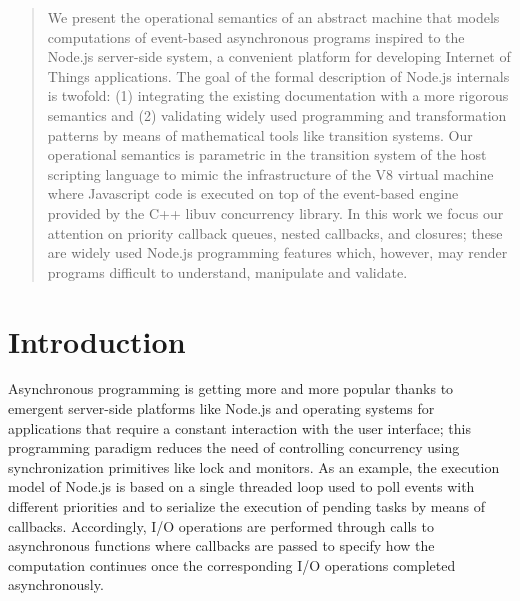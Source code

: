 \begin{abstract}
We present the operational semantics of an abstract  machine that models computations of event-based asynchronous programs inspired to the Node.js server-side system, a convenient platform for developing Internet of Things applications. 
The goal of the formal description of Node.js internals is twofold: 
(1) integrating the existing documentation with a more rigorous semantics and 
(2) validating widely used programming and transformation patterns by means of mathematical tools like transition systems. 
Our operational semantics is parametric in the transition system of the host scripting language to mimic the infrastructure of the V8 virtual machine 
where Javascript code is executed on top of the event-based engine provided by the C++ libuv concurrency library.
In this work we focus our attention on priority callback queues, nested callbacks, and closures; these are
widely used Node.js programming features which, however, may render programs difficult to understand, manipulate and validate. 
\end{abstract}
%
\section{Introduction}
Asynchronous programming is getting more and more popular thanks to emergent server-side platforms like Node.js and operating systems for applications that require a constant interaction with the user interface; this programming paradigm reduces the need of controlling concurrency using 
synchronization primitives like lock and monitors. As an example, the execution model of Node.js is based on a single threaded loop used to poll events with different priorities and to serialize the execution of pending tasks by means of callbacks. 
Accordingly, I/O operations are performed through calls to asynchronous functions where callbacks are passed to specify how the computation continues once the corresponding I/O operations completed
asynchronously.

